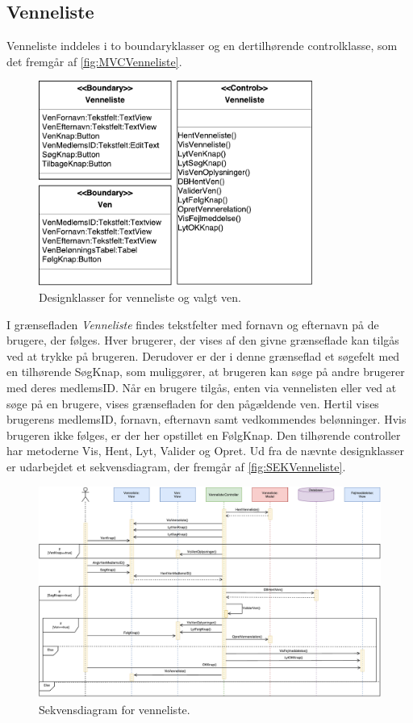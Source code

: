\subsection*{Venneliste}
Venneliste inddeles i to boundaryklasser og en dertilhørende controlklasse, som det fremgår af \autoref{fig:MVCVenneliste}. 

\begin{figure} [H]
\centering
\includegraphics[width=0.8\textwidth]{figures/MVC/MVCVenneliste}
\caption{Designklasser for venneliste og valgt ven.}
\label{fig:MVCVenneliste}
\end{figure}

\noindent
I grænsefladen \textit{Venneliste} findes tekstfelter med fornavn og efternavn på de brugere, der følges. Hver brugerer, der vises af den givne grænseflade kan tilgås ved at trykke på brugeren. Derudover er der i denne grænseflad et søgefelt med en tilhørende SøgKnap, som muliggører, at brugeren kan søge på andre brugerer med deres medlemsID. 
Når en brugere tilgås, enten via vennelisten eller ved at søge på en brugere, vises grænsefladen for den pågældende ven. Hertil vises brugerens medlemsID, fornavn, efternavn samt vedkommendes belønninger. Hvis brugeren ikke følges, er der her opstillet en FølgKnap.
Den tilhørende controller har metoderne Vis, Hent, Lyt, Valider og Opret. 
Ud fra de nævnte designklasser er udarbejdet et sekvensdiagram, der fremgår af \autoref{fig:SEKVenneliste}.

\begin{figure} [H]
\centering
\includegraphics[width=1\textwidth]{figures/Sek/SEKVenneliste}
\caption{Sekvensdiagram for venneliste.}
\label{fig:SEKVenneliste}
\end{figure}

